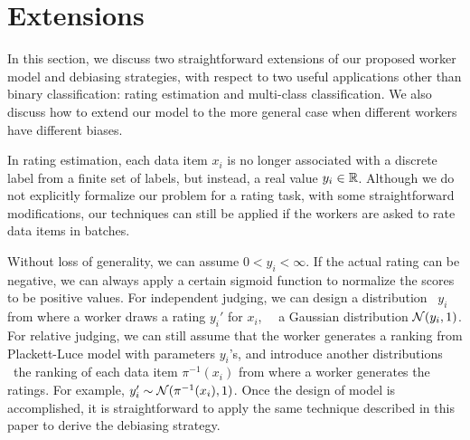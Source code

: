 
\section{Extensions}
\label{sec:ext}

In this section, we discuss two straightforward extensions of our proposed worker model and debiasing strategies, 
with respect to two useful applications other than binary classification: 
rating estimation and multi-class classification.  
We also discuss how to extend our model to the more general case when different workers have different biases.  

In rating estimation,
each data item $x_i$ is no longer associated with a discrete label
from a finite set of labels, 
but instead, a real value $y_i \in {\mathbb{R}}$.  
Although we do not explicitly formalize our problem for a rating task, 
with some straightforward modifications, 
our techniques can still be applied 
if the workers are asked to rate data items in batches.  

Without loss of generality, we can assume $0 < y_i < \infty$.  
If the actual rating can be negative, 
we can always apply a certain sigmoid function to normalize the scores to be positive values.  
For independent judging, we can design a distribution \wrt~$y_i$ from where a worker draws a rating $y_i'$ for $x_i$,
~\eg~a Gaussian distribution ${\mathcal{N}}(y_i, 1)$.  
For relative judging, we can still assume that the worker generates a ranking from Plackett-Luce model with parameters $y_i$'s, 
and introduce another distributions \wrt~the ranking of each data item $\pi^{-1}(x_i)$
from where a worker generates the ratings.  
For example, $y_i' \sim {\mathcal{N}}(\pi^{-1}(x_i), 1)$.  
Once the design of model is accomplished, 
it is straightforward to apply the same technique described in this paper 
to derive the debiasing strategy.



